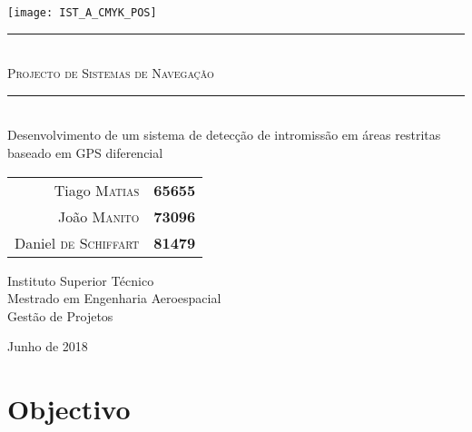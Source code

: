 \documentclass{article}
\begin{document}
\thispagestyle{empty}

\texttt{[image: IST\_A\_CMYK\_POS]}
	
\begin{center}
	\vspace{70mm} %
	\rule{\linewidth}{0.5pt} \\
    \vspace{2mm}
	\Huge \textsc{Projecto de Sistemas de Navegação} \\
	\rule{\linewidth}{2pt} \\
	\vspace{8mm} %
	\LARGE Desenvolvimento de um sistema de detecção de intromissão em áreas restritas baseado em GPS diferencial
	
	\vspace{\fill} %
	\large
	
	\begin{tabular}{r l}
		Tiago \textsc{Matias} & \textbf{65655} \\
		João \textsc{Manito} & \textbf{73096} \\
		Daniel \textsc{de Schiffart} & \textbf{81479}
	\end{tabular}
	
	\vspace{10mm} %
	\Large Instituto Superior Técnico \\
	Mestrado em Engenharia Aeroespacial \\
	\vspace{1mm}
	\large Gestão de Projetos
	
	\vspace{10mm} %
	\Large Junho de 2018
\end{center}

\newpage

\section{Objectivo}
\end{document}
